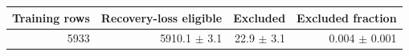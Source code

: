 \begin{tabular}{rrrr}
\toprule
Training rows & Recovery-loss eligible & Excluded & Excluded fraction \\
\midrule
5933 & 5910.1 $\pm$ 3.1 & 22.9 $\pm$ 3.1 & 0.004 $\pm$ 0.001 \\
\bottomrule
\end{tabular}
